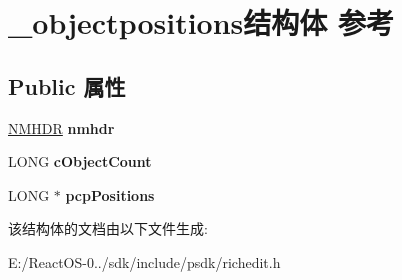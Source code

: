 \hypertarget{struct__objectpositions}{}\section{\+\_\+objectpositions结构体 参考}
\label{struct__objectpositions}
\subsection*{Public 属性}
\begin{DoxyCompactItemize}
\item 
\mbox{\label{struct__objectpositions_aa8c985029b67ef7f1aefa9d012f272c0}} 
\hyperlink{structtag_n_m_h_d_r}{N\+M\+H\+DR} {\bfseries nmhdr}
\item 
\mbox{\label{struct__objectpositions_a8cbc3903e3b27a339faf4c8f7420de3e}} 
L\+O\+NG {\bfseries c\+Object\+Count}
\item 
\mbox{\label{struct__objectpositions_ae61179779f3979528014172617089b52}} 
L\+O\+NG $\ast$ {\bfseries pcp\+Positions}
\end{DoxyCompactItemize}


该结构体的文档由以下文件生成\+:\begin{DoxyCompactItemize}
\item 
E\+:/\+React\+O\+S-\/0../sdk/include/psdk/richedit.\+h\end{DoxyCompactItemize}

